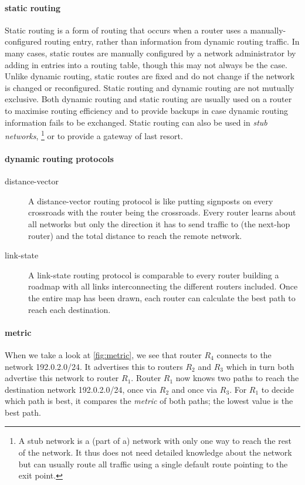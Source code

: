 \paragraph{static routing}
Static routing is a form of routing that occurs when a router uses a manually-configured routing entry, rather than information from dynamic routing traffic.
In many cases, static routes are manually configured by a network administrator by adding in entries into a routing table, though this may not always be the case.
Unlike dynamic routing, static routes are fixed and do not change if the network is changed or reconfigured.
Static routing and dynamic routing are not mutually exclusive.
Both dynamic routing and static routing are usually used on a router to maximise routing efficiency and to provide backups in case dynamic routing information fails to be exchanged.
Static routing can also be used in \emph{stub networks},%
%
\footnote{%
A stub network is a (part of a) network with only one way to reach the rest of the network.
It thus does not need detailed knowledge about the network but can usually route all traffic using a single default route pointing to the exit point.
}
or to provide a gateway of last resort.

\paragraph{dynamic routing protocols}%
\begin{description}
\item[distance-vector]
A distance-vector routing protocol is like putting signposts on every crossroads with the router being the crossroads.
Every router learns about all networks but only the direction it has to send traffic to (the next-hop router) and the total distance to reach the remote network.
\item[link-state]
A link-state routing protocol is comparable to every router building a roadmap with all links interconnecting the different routers included.
Once the entire map has been drawn, each router can calculate the best path to reach each destination.
\end{description}

\paragraph{metric}
When we take a look at \vref{fig:metric}, we see that router $R_4$ connects to the network 192.0.2.0/24.
It advertises this to routers $R_2$ and $R_3$ which in turn both advertise this network to router $R_1$.
Router $R_1$ now knows two paths to reach the destination network 192.0.2.0/24, once via $R_2$ and once via $R_3$.
For $R_1$ to decide which path is best, it compares the \emph{metric} of both paths; the lowest value is the best path.

